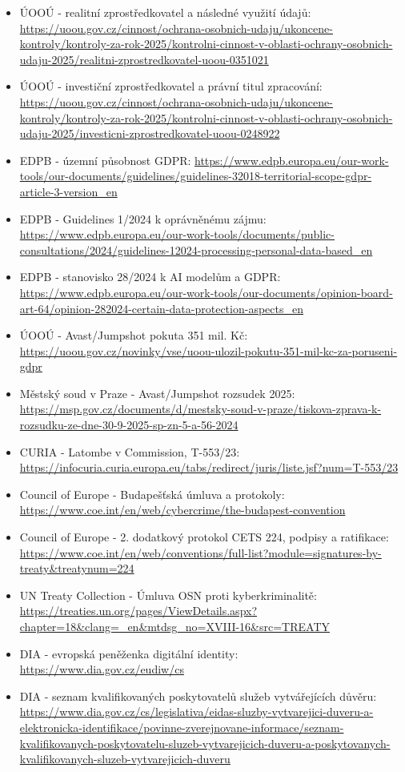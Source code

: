 \begin{itemize}
  \item ÚOOÚ - realitní zprostředkovatel a následné využití údajů: \url{https://uoou.gov.cz/cinnost/ochrana-osobnich-udaju/ukoncene-kontroly/kontroly-za-rok-2025/kontrolni-cinnost-v-oblasti-ochrany-osobnich-udaju-2025/realitni-zprostredkovatel-uoou-0351021}
  \item ÚOOÚ - investiční zprostředkovatel a právní titul zpracování: \url{https://uoou.gov.cz/cinnost/ochrana-osobnich-udaju/ukoncene-kontroly/kontroly-za-rok-2025/kontrolni-cinnost-v-oblasti-ochrany-osobnich-udaju-2025/investicni-zprostredkovatel-uoou-0248922}
  \item EDPB - územní působnost GDPR: \url{https://www.edpb.europa.eu/our-work-tools/our-documents/guidelines/guidelines-32018-territorial-scope-gdpr-article-3-version_en}
  \item EDPB - Guidelines 1/2024 k oprávněnému zájmu: \url{https://www.edpb.europa.eu/our-work-tools/documents/public-consultations/2024/guidelines-12024-processing-personal-data-based_en}
  \item EDPB - stanovisko 28/2024 k AI modelům a GDPR: \url{https://www.edpb.europa.eu/our-work-tools/our-documents/opinion-board-art-64/opinion-282024-certain-data-protection-aspects_en}
  \item ÚOOÚ - Avast/Jumpshot pokuta 351 mil. Kč: \url{https://uoou.gov.cz/novinky/vse/uoou-ulozil-pokutu-351-mil-kc-za-poruseni-gdpr}
  \item Městský soud v Praze - Avast/Jumpshot rozsudek 2025: \url{https://msp.gov.cz/documents/d/mestsky-soud-v-praze/tiskova-zprava-k-rozsudku-ze-dne-30-9-2025-sp-zn-5-a-56-2024}
  \item CURIA - Latombe v Commission, T-553/23: \url{https://infocuria.curia.europa.eu/tabs/redirect/juris/liste.jsf?num=T-553/23}
  \item Council of Europe - Budapešťská úmluva a protokoly: \url{https://www.coe.int/en/web/cybercrime/the-budapest-convention}
  \item Council of Europe - 2. dodatkový protokol CETS 224, podpisy a ratifikace: \url{https://www.coe.int/en/web/conventions/full-list?module=signatures-by-treaty&treatynum=224}
  \item UN Treaty Collection - Úmluva OSN proti kyberkriminalitě: \url{https://treaties.un.org/pages/ViewDetails.aspx?chapter=18&clang=_en&mtdsg_no=XVIII-16&src=TREATY}
  \item DIA - evropská peněženka digitální identity: \url{https://www.dia.gov.cz/eudiw/cs}
  \item DIA - seznam kvalifikovaných poskytovatelů služeb vytvářejících důvěru: \url{https://www.dia.gov.cz/cs/legislativa/eidas-sluzby-vytvarejici-duveru-a-elektronicka-identifikace/povinne-zverejnovane-informace/seznam-kvalifikovanych-poskytovatelu-sluzeb-vytvarejicich-duveru-a-poskytovanych-kvalifikovanych-sluzeb-vytvarejicich-duveru}

\end{itemize}
